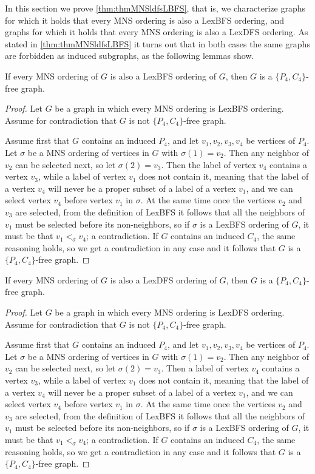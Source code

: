 \documentclass{svproc}
\begin{document}
In this section we prove \cref{thm:thmMNSldfsLBFS}, that is, we characterize graphs for which it holds that every MNS ordering is also a LexBFS ordering, and graphs for which it holds that every MNS ordering is also a LexDFS ordering. As stated in \cref{thm:thmMNSldfsLBFS} it turns out that in both cases the same graphs are forbidden as induced subgraphs, as the following lemmas show. 
\begin{theorem}
If every MNS ordering of $G$ is also a LexBFS ordering of $G$, then $G$ is a $\{P_4,C_4\}$-free graph.
\end{theorem}
\begin{proof}
Let $G$ be a graph in which every MNS ordering is LexBFS ordering. Assume for contradiction that $G$ is not $\{P_4,C_4\}$-free graph.

Assume first that $G$ contains an induced $P_4$, and let $v_1,v_2,v_3,v_4$ be vertices of $P_4$. Let $\sigma$ be a MNS ordering of vertices in $G$ with $\sigma(1)=v_2$. Then any neighbor of $v_2$ can be selected next, so let $\sigma(2)=v_3$.  Then the label of vertex $v_4$ contains a vertex $v_3$, while a label of vertex $v_1$ does not contain it, meaning that the label of a vertex $v_4$ will never be a proper subset of a label of a vertex $v_1$, and we can select vertex $v_4$ before vertex $v_1$ in $\sigma$. At the same time once the vertices $v_2$ and $v_3$ are selected, from the definition of LexBFS it follows that all the neighbors of $v_1$ must be selected before its non-neighbors, so if $\sigma$ is a LexBFS ordering of $G$, it must be that $v_1<_\sigma v_4$; a contradiction.
If $G$ contains an induced $C_4$, the same reasoning holds, so we get a contradiction in any case and it follows that $G$ is a $\{P_4,C_4\}$-free graph.
\end{proof}

\begin{lemma}
If every MNS ordering of $G$ is also a LexDFS ordering of $G$, then $G$ is a $\{P_4,C_4\}$-free graph.
\end{lemma}
\begin{proof}
Let $G$ be a graph in which every MNS ordering is LexDFS ordering. Assume for contradiction that $G$ is not $\{P_4,C_4\}$-free graph.

Assume first that $G$ contains an induced $P_4$, and let $v_1,v_2,v_3,v_4$ be vertices of $P_4$. Let $\sigma$ be a MNS ordering of vertices in $G$ with $\sigma(1)=v_2$. Then any neighbor of $v_2$ can be selected next, so let $\sigma(2)=v_3$.  Then a label of vertex $v_4$ contains a vertex $v_3$, while a label of vertex $v_1$ does not contain it, meaning that the label of a vertex $v_4$ will never be a proper subset of a label of a vertex $v_1$, and we can select vertex $v_4$ before vertex $v_1$ in $\sigma$. At the same time once the vertices $v_2$ and $v_3$ are selected, from the definition of LexBFS it follows that all the neighbors of $v_1$ must be selected before its non-neighbors, so if $\sigma$ is a LexBFS ordering of $G$, it must be that $v_1<_\sigma v_4$; a contradiction.
If $G$ contains an induced $C_4$, the same reasoning holds, so we get a contradiction in any case and it follows that $G$ is a $\{P_4,C_4\}$-free graph.
\end{proof}
\end{document}
